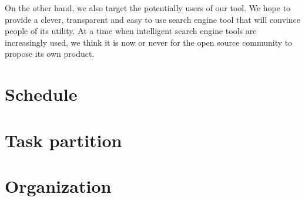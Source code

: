 \documentclass[a4paper,10pt]{article}
\begin{document}
On the other hand, we also target the potentially users of our tool. We hope to provide a clever, transparent and easy to use search 
engine tool that will convince people of its utility. At a time when intelligent search engine tools are increasingly used, we think it is
now or never for the open source community to propose its own product.

\section{Schedule}

\section{Task partition}

\section{Organization}

\end{document}
